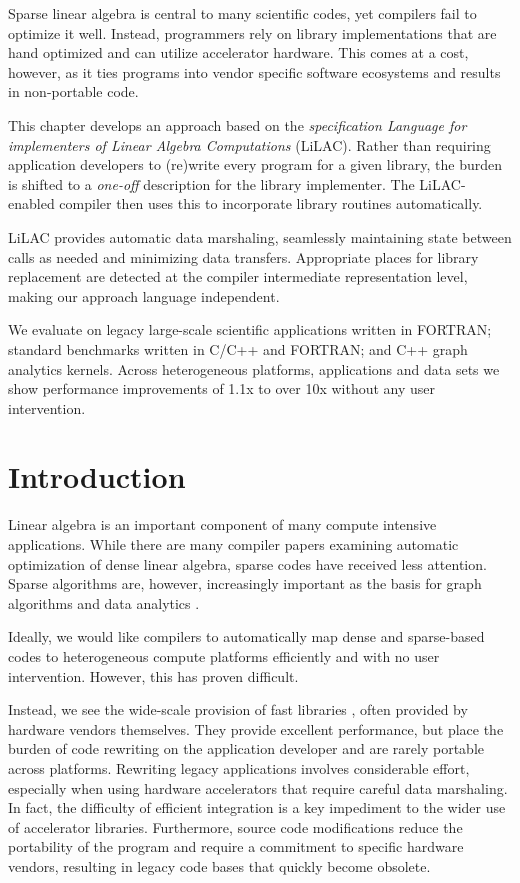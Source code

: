  
    Sparse linear algebra is central to many scientific codes, yet compilers
    fail to optimize it well.
    Instead, programmers rely on library implementations that are hand optimized
    and can utilize accelerator hardware.
    This comes at a cost, however, as it ties programs into vendor specific
    software ecosystems and results in non-portable code.

    This chapter develops an approach based on the {\em specification
    Language for implementers of Linear Algebra Computations} (LiLAC).
    Rather than requiring application developers to (re)write every program for
    a given library, the burden is shifted to a {\em one-off} description for
    the library implementer.
    The LiLAC-enabled compiler then uses this to incorporate library routines
    automatically.

    LiLAC provides automatic data marshaling, seamlessly maintaining state
    between calls as needed and minimizing data transfers.
    Appropriate places for library replacement are detected at the compiler
    intermediate representation level, making our approach language independent.

    We evaluate on legacy large-scale scientific applications written in FORTRAN;
    standard benchmarks written in C/C++ and FORTRAN; and C++ graph analytics kernels.
    Across heterogeneous platforms, applications and data sets we show performance
    improvements of 1.1x to over 10x without any user intervention.

\section{Introduction}

    Linear algebra is an important component of many compute intensive
    applications.
    While there are many compiler papers examining automatic optimization of
    dense linear algebra, sparse codes have received less attention. 
    Sparse algorithms are, however, increasingly important as the basis for
    graph algorithms and data analytics \cite{Kepner2015GraphsMA}.

Ideally, we would like compilers to automatically map dense and sparse-based
codes to heterogeneous compute platforms efficiently and with no user
intervention. However,  this has proven difficult.

Instead, we see the wide-scale provision of fast libraries
\cite{cusparse,clsparse,mkl}, often provided by hardware vendors themselves.
They provide excellent performance, but place the burden of code rewriting on
the application developer and are rarely portable across platforms.
Rewriting legacy applications involves considerable effort, especially when
using hardware accelerators that require careful data marshaling.
In fact, the difficulty of efficient integration is a key impediment to the
wider use of accelerator libraries.
Furthermore, source code modifications reduce the portability of the
program and require a commitment to specific hardware vendors, resulting in legacy
code bases that quickly become obsolete.

